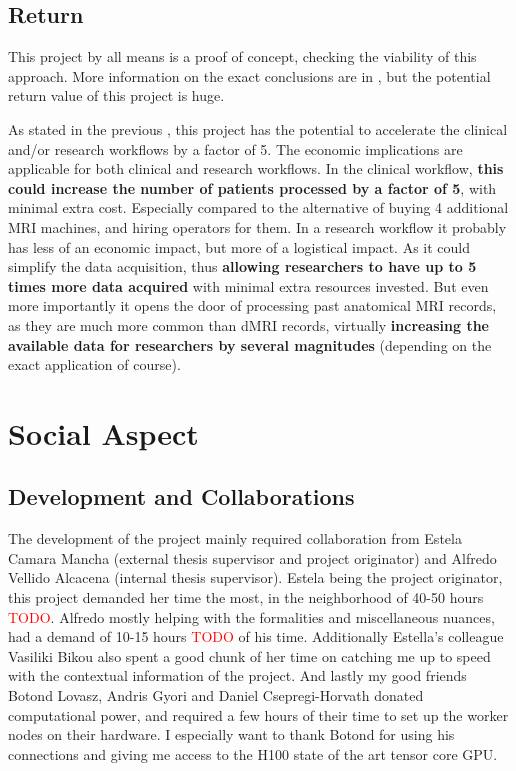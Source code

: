 \subsection{Return}

This project by all means is a proof of concept, checking the viability of this approach. More information on the exact conclusions are in , but the potential return value of this project is huge.\par
As stated in the previous , this project has the potential to accelerate the clinical and/or research workflows by a factor of 5. The economic implications are applicable for both clinical and research workflows. In the clinical workflow, \textbf{this could increase the number of patients processed by a factor of 5}, with minimal extra cost. Especially compared to the alternative of buying 4 additional MRI machines, and hiring operators for them. In a research workflow it probably has less of an economic impact, but more of a logistical impact. As it could simplify the data acquisition, thus \textbf{allowing researchers to have up to 5 times more data acquired} with minimal extra resources invested. But even more importantly it opens the door of processing past anatomical MRI records, as they are much more common than dMRI records, virtually \textbf{increasing the available data for researchers by several magnitudes} (depending on the exact application of course).

\section{Social Aspect}

\subsection{Development and Collaborations}

The development of the project mainly required collaboration from Estela Camara Mancha (external thesis supervisor and project originator) and Alfredo Vellido Alcacena (internal thesis supervisor). Estela being the project originator, this project demanded her time the most, in the neighborhood of 40-50 hours \textcolor{red}{TODO}. Alfredo mostly helping with the formalities and miscellaneous nuances, had a demand of 10-15 hours \textcolor{red}{TODO} of his time. Additionally Estella's colleague Vasiliki Bikou also spent a good chunk of her time on catching me up to speed with the contextual information of the project. And lastly my good friends Botond Lovasz, Andris Gyori and Daniel Csepregi-Horvath donated computational power, and required a few hours of their time to set up the worker nodes on their hardware. I especially want to thank Botond for using his connections and giving me access to the H100 state of the art tensor core GPU.

